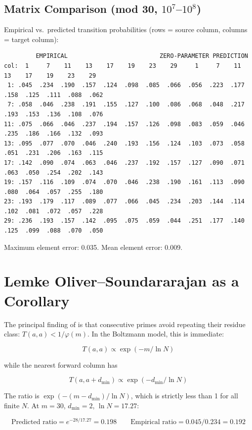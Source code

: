 \documentclass[
  11pt,
]{article}
\begin{document}
\subsection{Matrix Comparison (mod 30, \texorpdfstring{$10^7$--$10^8$}{10\^7--10\^8})}\label{sec:matrix}

Empirical vs.~predicted transition probabilities (rows = source column,
columns = target column):

\begin{verbatim}
         EMPIRICAL                          ZERO-PARAMETER PREDICTION
col:  1     7    11    13    17    19    23    29     1     7    11    13    17    19    23    29
 1: .045  .234  .190  .157  .124  .098  .085  .066  .056  .223  .177  .158  .125  .111  .088  .062
 7: .058  .046  .238  .191  .155  .127  .100  .086  .068  .048  .217  .193  .153  .136  .108  .076
11: .075  .066  .046  .237  .194  .157  .126  .098  .083  .059  .046  .235  .186  .166  .132  .093
13: .095  .077  .070  .046  .240  .193  .156  .124  .103  .073  .058  .051  .231  .206  .163  .115
17: .142  .090  .074  .063  .046  .237  .192  .157  .127  .090  .071  .063  .050  .254  .202  .143
19: .157  .116  .109  .074  .070  .046  .238  .190  .161  .113  .090  .080  .064  .057  .255  .180
23: .193  .179  .117  .089  .077  .066  .045  .234  .203  .144  .114  .102  .081  .072  .057  .228
29: .236  .193  .157  .142  .095  .075  .059  .044  .251  .177  .140  .125  .099  .088  .070  .050
\end{verbatim}

Maximum element error: 0.035. Mean element error: 0.009.

\section{Lemke Oliver--Soundararajan as a Corollary}\label{sec:los}

The principal finding of \cite{los} is that consecutive primes
avoid repeating their residue class: \(T(a, a) < 1/\varphi(m)\). In the
Boltzmann model, this is immediate:

\[T(a, a) \propto \exp(-m / \ln N)\]

while the nearest forward column has

\[T(a, a + d_{\min}) \propto \exp(-d_{\min} / \ln N)\]

The ratio is \(\exp(-(m - d_{\min})/\ln N)\), which is strictly less
than 1 for all finite \(N\). At \(m = 30\), \(d_{\min} = 2\),
\(\ln N = 17.27\):

\[\text{Predicted ratio} = e^{-28/17.27} = 0.198 \qquad \text{Empirical ratio} = 0.045/0.234 = 0.192\]
\end{document}
